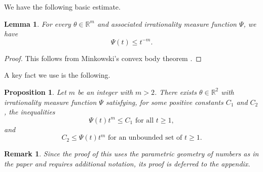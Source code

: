 \documentclass[reqno,11pt, twoside]{amsart}
\theoremstyle{plain}
\newtheorem{lem}[thm]{Lemma}
\newtheorem{rem}[thm]{Remark}
\newtheorem{prop}[thm]{Proposition}
\theoremstyle{definition}
\theoremstyle{definition}
\theoremstyle{remark}
\numberwithin{equation}{section}
\newcommand{\R}{{\mathbb{R}}}
\begin{document}
We have the following basic estimate.
\begin{lem}
    For every $\theta \in \R^m$ and associated irrationality measure function $\Psi$, we have
    \begin{equation*}
        \Psi(t) \leq t^{-m}.
    \end{equation*}
\end{lem}
\begin{proof}
     This follows from Minkowski's convex body theorem \cite[II, Theorem 2B]{Schmidt-DA}.
\end{proof}
A key fact we use is the following.
 \begin{prop}\label{prop: special singular form}
     Let $m$ be an integer with $m > 2$. There exists $\theta \in \mathbb{R}^2$ with irrationality measure function $\Psi$ satisfying, for some positive constants $C_1$ and $C_2$, the inequalities
     \begin{equation*}
         \Psi(t) t^m \leq C_1 \text{ for all }  t \geq 1,
     \end{equation*}
     and
     \begin{equation*}
         C_2 \leq \Psi(t) t^m \text{ for an unbounded set of } t \geq 1. 
     \end{equation*}
 \end{prop}
 \begin{rem}
     Since the proof of this uses the parametric geometry of numbers as in the paper \cite{Roy-MathZ} and requires additional notation, its proof is deferred to the appendix.
 \end{rem}
\end{document}
